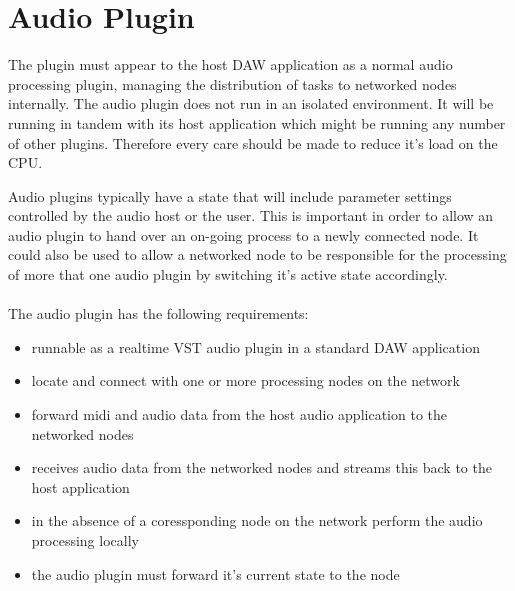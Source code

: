 \section{Audio Plugin}

The plugin must appear to the host DAW application as a normal audio processing plugin, managing the distribution of tasks to networked nodes internally. The audio plugin does not run in an isolated environment. It will be running in tandem with its host application which might be running any number of other plugins. Therefore every care should be made to reduce it's load on the CPU.

Audio plugins typically have a state that will include parameter settings controlled by the audio host or the user. This is important in order to allow an audio plugin to hand over an on-going process to a newly connected node. It could also be used to allow a networked node to be responsible for the processing of more that one audio plugin by switching it's active state accordingly.\\
\\
\noindent
The audio plugin has the following requirements:

\begin{itemize}

\item runnable as a realtime VST audio plugin in a standard DAW application
\item locate and connect with one or more processing nodes on the network
\item forward midi and audio data from the host audio application to the networked nodes
\item receives audio data from the networked nodes and streams this back to the host application
\item in the absence of a coressponding node on the network perform the audio processing locally
\item the audio plugin must forward it's current state to the node

\end{itemize}
